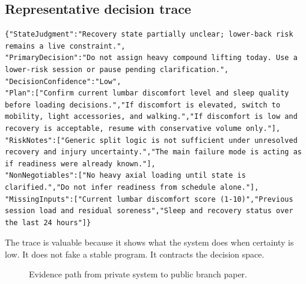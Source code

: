 \documentclass[11pt]{article}
\begin{document}
\subsection{Representative decision trace}
\begin{verbatim}
{"StateJudgment":"Recovery state partially unclear; lower-back risk remains a live constraint.",
"PrimaryDecision":"Do not assign heavy compound lifting today. Use a lower-risk session or pause pending clarification.",
"DecisionConfidence":"Low",
"Plan":["Confirm current lumbar discomfort level and sleep quality before loading decisions.","If discomfort is elevated, switch to mobility, light accessories, and walking.","If discomfort is low and recovery is acceptable, resume with conservative volume only."],
"RiskNotes":["Generic split logic is not sufficient under unresolved recovery and injury uncertainty.","The main failure mode is acting as if readiness were already known."],
"NonNegotiables":["No heavy axial loading until state is clarified.","Do not infer readiness from schedule alone."],
"MissingInputs":["Current lumbar discomfort score (1-10)","Previous session load and residual soreness","Sleep and recovery status over the last 24 hours"]}
\end{verbatim}
The trace is valuable because it shows what the system does when certainty is low. It does not fake a stable program. It contracts the decision space.
\begin{figure}[htbp]
\centering
{}
\caption{Evidence path from private system to public branch paper.}
\end{figure}
\end{document}

